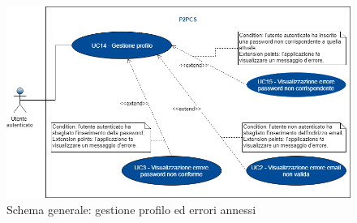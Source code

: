 \begin{figure}[h]
	\includegraphics[width=15cm]{res/images/Schemagenerale5.png}
	\centering
	\caption{Schema generale: gestione profilo ed errori annessi}
\end{figure}
